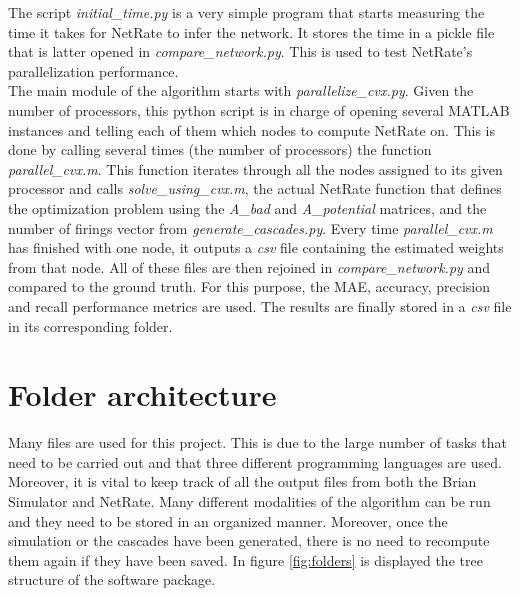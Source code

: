 The script \textit{initial\_time.py} is a very simple program that starts measuring the time it takes for NetRate to infer the network. It stores the time in a pickle file that is latter opened in \textit{compare\_network.py}. This is used to test NetRate's parallelization performance.\\

The main module of the algorithm starts with \textit{parallelize\_cvx.py}. Given the number of processors, this python script is in charge of opening several MATLAB instances and telling each of them which nodes to compute NetRate on. This is done by calling several times (the number of processors) the function \textit{parallel\_cvx.m}. This function iterates through all the nodes assigned to its given processor and calls \textit{solve\_using\_cvx.m}, the actual NetRate function that defines the optimization problem using the \textit{A\_bad} and \textit{A\_potential} matrices, and the number of firings vector from \textit{generate\_cascades.py}.
Every time \textit{parallel\_cvx.m} has finished with one node, it outputs a \textit{csv} file containing the estimated weights from that node. All of these files are then rejoined in \textit{compare\_network.py} and compared to the ground truth. For this purpose, the MAE, accuracy, precision and recall performance metrics are used. The results are finally stored in a \textit{csv} file in its corresponding folder.


\section{Folder architecture}

Many files are used for this project. This is due to the large number of tasks that need to be carried out and that three different programming languages are used. Moreover, it is vital to keep track of all the output files from both the Brian Simulator and NetRate. Many different modalities of the algorithm can be run and they need to be stored in an organized manner. Moreover, once the simulation or the cascades have been generated, there is no need to recompute them again if they have been saved. In figure \ref{fig:folders} is displayed the tree structure of the software package.


